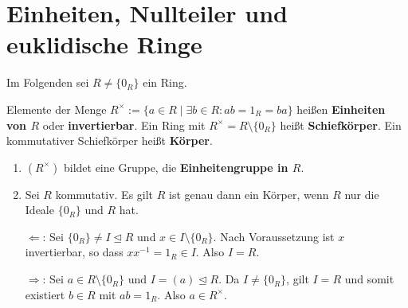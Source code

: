 \section{Einheiten, Nullteiler und euklidische Ringe}
Im Folgenden sei $R \neq \{0_R\}$ ein Ring.
\begin{definition}
	Elemente der Menge $R^\times := \{a \in R \mid \exists b \in R : ab = 1_R = ba\}$ heißen \textbf{Einheiten von $R$} oder \textbf{invertierbar}. Ein Ring mit $R^\times = R \setminus \{0_R\}$ heißt \textbf{Schiefkörper}. Ein kommutativer Schiefkörper heißt \textbf{Körper}.
\end{definition}
\begin{rem}\label{rem5_2}
	\begin{enumerate}[label=(\roman*)]
		\item $(R^\times)$ bildet eine Gruppe, die \textbf{Einheitengruppe in $R$}.
		\item Sei $R$ kommutativ. Es gilt $R$ ist genau dann ein Körper, wenn $R$ nur die Ideale $\{0_R\}$ und $R$ hat.
		\begin{inlproof}
			\glqq{}$\Leftarrow$\grqq: Sei $\{0_R\} \neq I \unlhd R$ und $x \in I \setminus \{0_R\}$. Nach Voraussetzung ist $x$ invertierbar, so dass $xx^{-1} = 1_R \in I$. Also $I=R$.
			
			\glqq{}$\Rightarrow$\grqq: Sei $a \in R \setminus \{0_R\}$ und $I = (a) \unlhd R$. Da $I \neq \{0_R\}$, gilt $I=R$ und somit existiert $b \in R$ mit $ab = 1_R$. Also $a \in R^\times$.
		\end{inlproof}
	\end{enumerate}
\end{rem}
